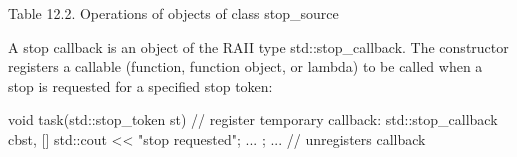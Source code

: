\begin{center}
Table 12.2. Operations of objects of class stop\_source
\end{center}


A stop callback is an object of the RAII type std::stop\_callback. The constructor registers a callable (function, function object, or lambda) to be called when a stop is requested for a specified stop token:

\begin{cpp}
void task(std::stop_token st)
{
	// register temporary callback:
	std::stop_callback cb{st, []{
			std::cout << "stop requested\n";
			...
	}};
	...
} // unregisters callback
\end{cpp}

